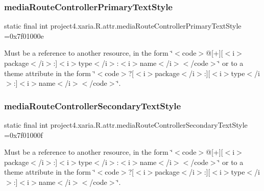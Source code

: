 \subsubsection{\texorpdfstring{media\+Route\+Controller\+Primary\+Text\+Style}{mediaRouteControllerPrimaryTextStyle}}
{\footnotesize\ttfamily static final int project4.\+xaria.\+R.\+attr.\+media\+Route\+Controller\+Primary\+Text\+Style =0x7f01000e\hspace{0.3cm}{\ttfamily [static]}}

Must be a reference to another resource, in the form \char`\"{}$<$code$>$@\mbox{[}+\mbox{]}\mbox{[}$<$i$>$package$<$/i$>$\+:\mbox{]}$<$i$>$type$<$/i$>$\+:$<$i$>$name$<$/i$>$$<$/code$>$\char`\"{} or to a theme attribute in the form \char`\"{}$<$code$>$?\mbox{[}$<$i$>$package$<$/i$>$\+:\mbox{]}\mbox{[}$<$i$>$type$<$/i$>$\+:\mbox{]}$<$i$>$name$<$/i$>$$<$/code$>$\char`\"{}. \mbox{\label{classproject4_1_1xaria_1_1R_1_1attr_a9427a0abc269615286c5239596b2da35}} 
\subsubsection{\texorpdfstring{media\+Route\+Controller\+Secondary\+Text\+Style}{mediaRouteControllerSecondaryTextStyle}}
{\footnotesize\ttfamily static final int project4.\+xaria.\+R.\+attr.\+media\+Route\+Controller\+Secondary\+Text\+Style =0x7f01000f\hspace{0.3cm}{\ttfamily [static]}}

Must be a reference to another resource, in the form \char`\"{}$<$code$>$@\mbox{[}+\mbox{]}\mbox{[}$<$i$>$package$<$/i$>$\+:\mbox{]}$<$i$>$type$<$/i$>$\+:$<$i$>$name$<$/i$>$$<$/code$>$\char`\"{} or to a theme attribute in the form \char`\"{}$<$code$>$?\mbox{[}$<$i$>$package$<$/i$>$\+:\mbox{]}\mbox{[}$<$i$>$type$<$/i$>$\+:\mbox{]}$<$i$>$name$<$/i$>$$<$/code$>$\char`\"{}. \mbox{\label{classproject4_1_1xaria_1_1R_1_1attr_a719833c01efa7bf01b60ca4f7e48aefe}} 
